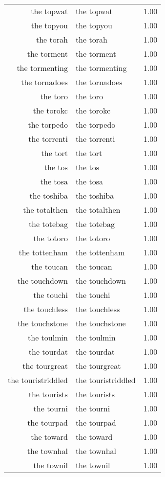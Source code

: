 \begin{table}[ht]
\begin{tabular}{rlr}
  the topwat & the topwat & 1.00 \\ 
  the topyou & the topyou & 1.00 \\ 
  the torah & the torah & 1.00 \\ 
  the torment & the torment & 1.00 \\ 
  the tormenting & the tormenting & 1.00 \\ 
  the tornadoes & the tornadoes & 1.00 \\ 
  the toro & the toro & 1.00 \\ 
  the torokc & the torokc & 1.00 \\ 
  the torpedo & the torpedo & 1.00 \\ 
  the torrenti & the torrenti & 1.00 \\ 
  the tort & the tort & 1.00 \\ 
  the tos & the tos & 1.00 \\ 
  the tosa & the tosa & 1.00 \\ 
  the toshiba & the toshiba & 1.00 \\ 
  the totalthen & the totalthen & 1.00 \\ 
  the totebag & the totebag & 1.00 \\ 
  the totoro & the totoro & 1.00 \\ 
  the tottenham & the tottenham & 1.00 \\ 
  the toucan & the toucan & 1.00 \\ 
  the touchdown & the touchdown & 1.00 \\ 
  the touchi & the touchi & 1.00 \\ 
  the touchless & the touchless & 1.00 \\ 
  the touchstone & the touchstone & 1.00 \\ 
  the toulmin & the toulmin & 1.00 \\ 
  the tourdat & the tourdat & 1.00 \\ 
  the tourgreat & the tourgreat & 1.00 \\ 
  the touristriddled & the touristriddled & 1.00 \\ 
  the tourists & the tourists & 1.00 \\ 
  the tourni & the tourni & 1.00 \\ 
  the tourpad & the tourpad & 1.00 \\ 
  the toward & the toward & 1.00 \\ 
  the townhal & the townhal & 1.00 \\ 
  the townil & the townil & 1.00 \\ 

\end{tabular}
\end{table}
